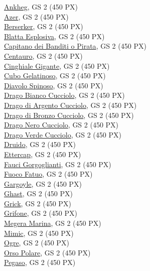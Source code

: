 \begin{multicols}{3}
{\hyperlink{Ankheg}{Ankheg}, GS 2 (450 PX)\\
\hyperlink{Azer}{Azer}, GS 2 (450 PX)\\
\hyperlink{Berserker}{Berserker}, GS 2 (450 PX)\\
\hyperlink{Blatta Esplosiva}{Blatta Esplosiva}, GS 2 (450 PX)\\
\hyperlink{Capitano dei Banditi o Pirata}{Capitano dei Banditi o Pirata}, GS 2 (450 PX)\\
\hyperlink{Centauro}{Centauro}, GS 2 (450 PX)\\
\hyperlink{Cinghiale Gigante}{Cinghiale Gigante}, GS 2 (450 PX)\\
\hyperlink{Cubo Gelatinoso}{Cubo Gelatinoso}, GS 2 (450 PX)\\
\hyperlink{Diavolo Spinoso}{Diavolo Spinoso}, GS 2 (450 PX)\\
\hyperlink{Drago Bianco Cucciolo}{Drago Bianco Cucciolo}, GS 2 (450 PX)\\
\hyperlink{Drago di Argento Cucciolo}{Drago di Argento Cucciolo}, GS 2 (450 PX)\\
\hyperlink{Drago di Bronzo Cucciolo}{Drago di Bronzo Cucciolo}, GS 2 (450 PX)\\
\hyperlink{Drago Nero Cucciolo}{Drago Nero Cucciolo}, GS 2 (450 PX)\\
\hyperlink{Drago Verde Cucciolo}{Drago Verde Cucciolo}, GS 2 (450 PX)\\
\hyperlink{Druido}{Druido}, GS 2 (450 PX)\\
\hyperlink{Ettercap}{Ettercap}, GS 2 (450 PX)\\
\hyperlink{Fauci Gorgoglianti}{Fauci Gorgoglianti}, GS 2 (450 PX)\\
\hyperlink{Fuoco Fatuo}{Fuoco Fatuo}, GS 2 (450 PX)\\
\hyperlink{Gargoyle}{Gargoyle}, GS 2 (450 PX)\\
\hyperlink{Ghast}{Ghast}, GS 2 (450 PX)\\
\hyperlink{Grick}{Grick}, GS 2 (450 PX)\\
\hyperlink{Grifone}{Grifone}, GS 2 (450 PX)\\
\hyperlink{Megera Marina}{Megera Marina}, GS 2 (450 PX)\\
\hyperlink{Mimic}{Mimic}, GS 2 (450 PX)\\
\hyperlink{Ogre}{Ogre}, GS 2 (450 PX)\\
\hyperlink{Orso Polare}{Orso Polare}, GS 2 (450 PX)\\
\hyperlink{Pegaso}{Pegaso}, GS 2 (450 PX)\\
}
\end{multicols}
